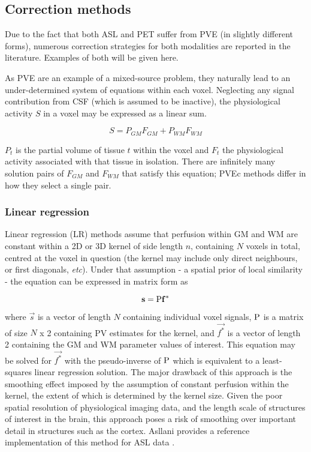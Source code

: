 \subsection{Correction methods}

Due to the fact that both ASL and PET suffer from PVE (in slightly different forms), numerous correction strategies for both modalities are reported in the literature. Examples of both will be given here. 

As PVE are an example of a mixed-source problem, they naturally lead to an under-determined system of equations within each voxel. Neglecting any signal contribution from CSF (which is assumed to be inactive), the physiological activity $S$ in a voxel may be expressed as a linear sum. 

\begin{equation}
S = P_{GM} F_{GM}+ P_{WM} F_{WM}
\end{equation} 

$P_t$ is the partial volume of tissue $t$ within the voxel and $F_{t}$ the physiological activity associated with that tissue in isolation. There are infinitely many solution pairs of $F_{GM}$ and $F_{WM}$ that satisfy this equation; PVEc methods differ in how they select a single pair.

\subsubsection{Linear regression}

Linear regression (LR) methods assume that perfusion within GM and WM are constant within a 2D or 3D kernel of side length $n$, containing $N$ voxels in total, centred at the voxel in question (the kernel may include only direct neighbours, or first diagonals, \textit{etc}). Under that assumption - a spatial prior of local similarity - the equation can be expressed in matrix form as

\begin{equation}
\mathbf{s} = \mathrm{P} \mathbf{f^*}
\end{equation} 

where $\vec{s}$ is a vector of length $N$ containing individual voxel signals, $\mathrm{P}$ is a matrix of size $N$ x 2 containing PV estimates for the kernel, and $\vec{f^*}$ is a vector of length 2 containing the GM and WM parameter values of interest. This equation may be solved for $\vec{f^*}$ with the pseudo-inverse of $\mathrm{P}$ which is equivalent to a least-squares linear regression solution. The major drawback of this approach is the smoothing effect imposed by the assumption of constant perfusion within the kernel, the extent of which is determined by the kernel size. Given the poor spatial resolution of physiological imaging data, and the length scale of structures of interest in the brain, this approach poses a risk of smoothing over important detail in structures such as the cortex. Asllani provides a reference implementation of this method for ASL data \cite{Asllani2008}. 

